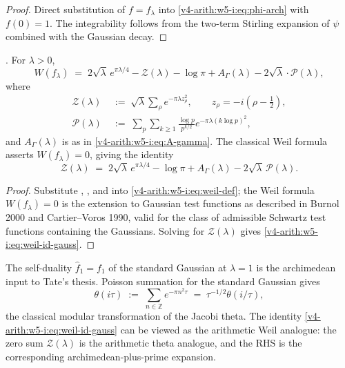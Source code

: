 \begin{proof}
Direct substitution of \(f=f_{\lambda}\) into
\eqref{v4-arith:w5-i:eq:phi-arch} with \(f(0)=1\). The integrability
follows from the two-term Stirling expansion of \(\psi\) combined with
the Gaussian decay.
\end{proof}

\begin{theorem}
\label{v4-arith:w5-i:thm:weil-gauss-closed}
\ClaimStatusProvedHere. For \(\lambda>0\),
\begin{equation}
\label{v4-arith:w5-i:eq:weil-gauss-closed}
W(f_{\lambda})\;=\;2\sqrt{\lambda}\,e^{\pi\lambda/4}-\mathcal{Z}(\lambda)-\log\pi+A_{\Gamma}(\lambda)-2\sqrt{\lambda}\cdot \mathcal{P}(\lambda),
\end{equation}
where
\begin{align}
\mathcal{Z}(\lambda)
&\;:=\;\sqrt{\lambda}\sum_{\rho}e^{-\pi\lambda z_{\rho}^{2}},
\qquad z_{\rho}=-i(\rho-\tfrac12),\label{v4-arith:w5-i:eq:Z-lambda}\\
\mathcal{P}(\lambda)
&\;:=\;\sum_{p}\sum_{k\geq 1}\frac{\log p}{p^{k/2}}e^{-\pi\lambda(k\log p)^{2}},\label{v4-arith:w5-i:eq:P-lambda}
\end{align}
and \(A_{\Gamma}(\lambda)\) is as in \eqref{v4-arith:w5-i:eq:A-gamma}.
The classical Weil formula asserts \(W(f_{\lambda})=0\), giving the
identity
\begin{equation}
\label{v4-arith:w5-i:eq:weil-id-gauss}
\mathcal{Z}(\lambda)\;=\;2\sqrt{\lambda}\,e^{\pi\lambda/4}-\log\pi+A_{\Gamma}(\lambda)-2\sqrt{\lambda}\,\mathcal{P}(\lambda).
\end{equation}
\end{theorem}

\begin{proof}
Substitute ,
, and
 into \eqref{v4-arith:w5-i:eq:weil-def};
the Weil formula \(W(f_{\lambda})=0\) is the extension to Gaussian
test functions as described in Burnol 2000 and Cartier--Voros 1990,
valid for the class of admissible Schwartz test functions containing
the Gaussians. Solving for \(\mathcal{Z}(\lambda)\) gives
\eqref{v4-arith:w5-i:eq:weil-id-gauss}.
\end{proof}

\begin{remark}
\label{v4-arith:w5-i:rem:poisson}
The self-duality \(\widehat{f}_{1}=f_{1}\) of the standard Gaussian
at \(\lambda=1\) is the archimedean input to Tate's thesis. Poisson
summation for the standard Gaussian gives
\[
\theta(i\tau)\;:=\;\sum_{n\in\mathbb{Z}}e^{-\pi n^{2}\tau}\;=\;\tau^{-1/2}\theta(i/\tau),
\]
the classical modular transformation of the Jacobi theta. The
identity \eqref{v4-arith:w5-i:eq:weil-id-gauss} can be viewed as the
arithmetic Weil analogue: the zero sum \(\mathcal{Z}(\lambda)\) is the
arithmetic theta analogue, and the RHS is the corresponding
archimedean-plus-prime expansion.
\end{remark}

